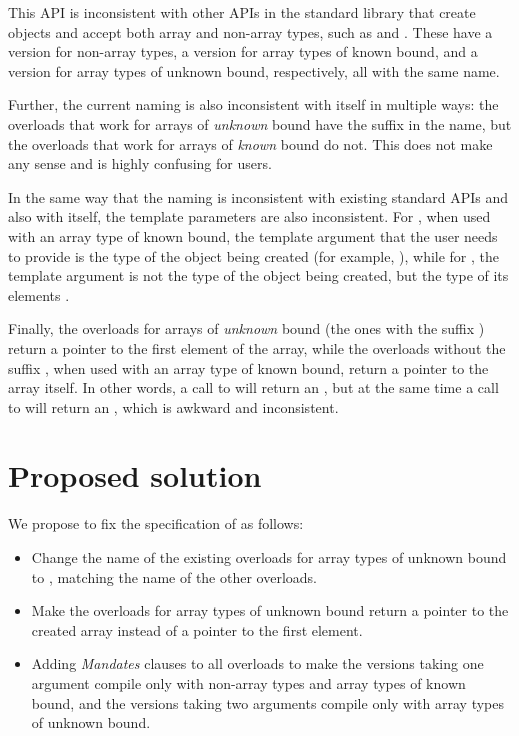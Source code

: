 This API is inconsistent with other APIs in the standard library that create objects and accept both array and non-array types, such as  and . These have a version for non-array types, a version for array types of known bound, and a version for array types of unknown bound, respectively, all with the same name.

Further, the current naming is also inconsistent with itself in multiple ways: the overloads that work for arrays of \emph{unknown} bound have the suffix  in the name, but the overloads that work for arrays of \emph{known} bound do not. This does not make any sense and is highly confusing for users.

In the same way that the naming is inconsistent with existing standard APIs and also with itself, the template parameters are also inconsistent. For , when used with an array type  of known bound, the template argument that the user needs to provide is the type  of the object being created (for example, ), while for , the template argument is not the type  of the object being created, but the type of its elements .

Finally, the overloads for arrays of \emph{unknown} bound (the ones with the suffix ) return a pointer to the first element of the array, while the overloads without the suffix , when used with an array type of known bound, return a pointer to the array itself. In other words, a call to  will return an , but at the same time a call to  will return an , which is awkward and inconsistent.
\section{Proposed solution}
\label{sec:solution}

We propose to fix the specification of  as follows:

\begin{itemize}
\item Change the name of the existing \mbox{} overloads for array types of unknown bound to \mbox{}, matching the name of the other overloads.
\item Make the overloads for array types of unknown bound return a pointer to the created array instead of a pointer to the first element.
\item Adding \emph{Mandates} clauses to all overloads to make the versions taking one argument compile only with non-array types and array types of known bound, and the versions taking two arguments compile only with array types of unknown bound.
\end{itemize}

